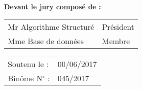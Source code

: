 \begin{titlepage}
\begin{center}
\vspace{\fill}

\textbf{Devant le jury composé de :}

\vspace{0.5em}

\begin{minipage}[c]{0.5\textwidth}
\begin{tabular}{p{} l}
Mr Algorithme Structuré & Président \\
Mme Base de données & Membre
\end{tabular}
\end{minipage}

\vfill

\begin{tabular}{l l}
  Soutenu le : & 00/06/2017 \\[0.3em]
  Binôme N$^\circ$ : & 045/2017
\end{tabular}
\end{center}
\end{titlepage}
